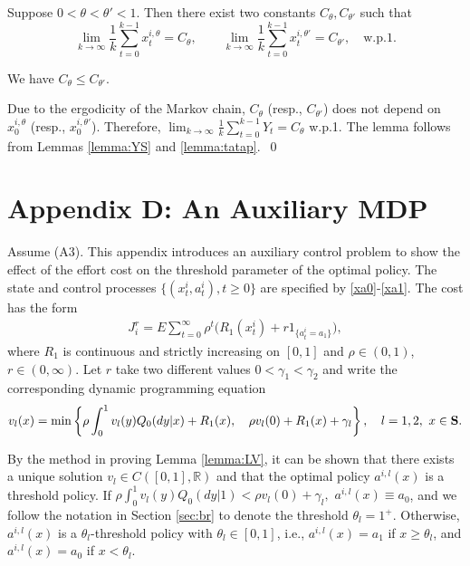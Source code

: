 \documentclass[graybox]{svmult}
\def\bS{{\bf S}}
\begin{document}
Suppose $0<\theta<\theta'<1$. Then there exist two constants $C_\theta, C_{\theta'}$ such that
$$
\lim_{k\to \infty }  \frac{1}{k}\sum_{t=0}^{k-1}x_t^{i,\theta}=C_\theta, \qquad \lim_{k\to \infty }  \frac{1}{k}\sum_{t=0}^{k-1}x_t^{i, \theta'}
= C_{\theta'},  \quad \mbox{w.p.1.}
$$

\begin{lemma} \label{lemma:bb}
We have $C_\theta\le C_{\theta'}$.
\end{lemma}

\proof Due to the ergodicity of the Markov chain, $C_\theta$ (resp., $C_{\theta'}$) does not depend on   $x_0^{i, \theta}$ (resp., $x_0^{i, \theta'}$). Therefore, $\lim_{k\to \infty}\frac{1}{k} \sum_{t=0}^{k-1} Y_t=C_\theta$ w.p.1.
The lemma follows from     Lemmas  \ref{lemma:YS} and \ref{lemma:tatap}.~\qed




\section*{Appendix D: An Auxiliary MDP}
\renewcommand{\theequation}{D.\arabic{equation}}
\setcounter{equation}{0}
\renewcommand{\thetheorem}{D.\arabic{theorem}}
\setcounter{theorem}{0}
\renewcommand{\thelemma}{D.\arabic{lemma}}
\setcounter{lemma}{0}
\renewcommand{\theremark}{D.\arabic{remark}}
\setcounter{remark}{0}


Assume (A3).
This appendix introduces an auxiliary control problem
to show the effect of the effort cost on the threshold parameter of the optimal policy.
The state and control processes
$\{(x_t^i, a_t^i), t\ge 0 \}$  are specified by  \eqref{xa0}-\eqref{xa1}. The cost has the form
\begin{align}
J_i^r=E\sum_{t=0}^\infty \rho^t \big(R_1(x^i_t)+  r 1_{\{a_t^i=a_1\}} \big),
\label{jir}
\end{align}
where $R_1$ is continuous and strictly increasing on $[0, 1]$ and $\rho \in (0,1)$, $r\in (0, \infty)$.
Let $r$ take two different values  $0<\gamma_1<\gamma_2$ and write the
corresponding dynamic programming equation
\begin{align}
v_l(x) =\min \left\{\rho \int_0^1 v_l (y) Q_0(dy|x)+R_1(x), \quad \rho v_l(0) +R_1(x)+\gamma_l   \right\} , \quad l=1,2,\ x\in \bS.\label{vlr12}
\end{align}

By the method in proving Lemma \ref{lemma:LV}, it can be shown that there exists a unique solution
$v_l\in C([0,1], \mathbb{R})$ and that the optimal policy $a^{i,l}(x)$ is a threshold policy.
If
$ \rho \int_0^1 v_l (y) Q_0(dy|1)<\rho v_l(0)+\gamma_l,
$
$a^{i,l}(x)\equiv  a_0$, and we follow the notation in Section \ref{sec:br}
to  denote the threshold  $\theta_l=1^+$. Otherwise, $a^{i,l}(x)$ is a
$\theta_l$-threshold policy with  $\theta_l\in [0,1]$, i.e., $a^{i,l}(x)= a_1$ if $x\ge \theta_l$, and $a^{i,l}(x)=a_0$ if $x<\theta_l$.
\end{document}
